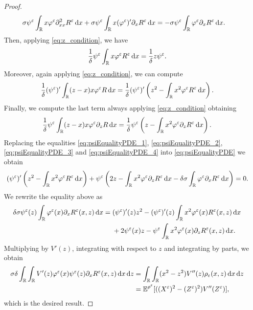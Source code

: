 \documentclass[10pt]{article}
\begin{document}
\begin{proof}
\begin{equation}
\begin{aligned}
	\sigma \psi^\varepsilon \int_{\mathbb{R}}  x \varphi^\varepsilon \partial^2_{xx} R^\varepsilon \,\mathrm{d} x+ \sigma \psi^\varepsilon \int_{\mathbb{R}} x (\varphi^\varepsilon)' \partial_x R^\varepsilon \,\mathrm{d} x &= -\sigma \psi^\varepsilon \int_{\mathbb{R}} \varphi^\varepsilon \partial_x R^\varepsilon \,\mathrm{d} x.
\end{aligned}
\end{equation}
Then, applying \eqref{eq:z_condition}, we have
\begin{equation}\label{eq:psiEqualityPDE_2}
	\frac1\delta \psi^\varepsilon \int_{\mathbb{R}} x \varphi^\varepsilon  R^\varepsilon \,\mathrm{d} x = \frac1\delta z \psi^\varepsilon.
\end{equation}
Moreover, again applying \eqref{eq:z_condition}, we can compute
\begin{equation}\label{eq:psiEqualityPDE_3}
\begin{aligned}
	\frac1\delta (\psi^\varepsilon)' \int_{\mathbb{R}} (z-x)x \varphi^\varepsilon  R \,\mathrm{d} x = \frac1\delta (\psi^\varepsilon)' \left(z^2 - \int_{\mathbb{R}} x^2 \varphi^\varepsilon R^\varepsilon \,\mathrm{d} x\right).
\end{aligned}
\end{equation}
Finally, we compute the last term always applying \eqref{eq:z_condition} obtaining
\begin{equation}\label{eq:psiEqualityPDE_4}
	\frac1\delta \psi^\varepsilon \int_{\mathbb{R}} (z-x)x \varphi^\varepsilon \partial_z R \,\mathrm{d} x = \frac1\delta \psi^\varepsilon\left(z - \int_{\mathbb{R}} x^2 \varphi^\varepsilon \partial_z R^\varepsilon \,\mathrm{d} x\right).
\end{equation}
Replacing the equalities \eqref{eq:psiEqualityPDE_1}, \eqref{eq:psiEqualityPDE_2}, \eqref{eq:psiEqualityPDE_3} and \eqref{eq:psiEqualityPDE_4} into \eqref{eq:psiEqualityPDE} we obtain
\begin{equation}
(\psi^\varepsilon)' \left ( z^2 - \int_{\mathbb{R}} x^2 \varphi^\varepsilon R^\varepsilon \,\mathrm{d} x \right ) + \psi^\varepsilon \left ( 2z - \int_{\mathbb{R}} x^2 \varphi^\varepsilon \partial_z R^\varepsilon \,\mathrm{d} x - \delta \sigma \int_{\mathbb{R}} \varphi^\varepsilon \partial_x R^\varepsilon \,\mathrm{d} x \right ) = 0.
\end{equation}
We rewrite the equality above as
\begin{equation} \label{eq:psiEquality}
\delta \sigma \psi^\varepsilon(z) \int_{\mathbb{R}} \varphi^\varepsilon(x) \partial_x R^\varepsilon(x, z) \,\mathrm{d} x = 
\begin{aligned}[t] &(\psi^\varepsilon)'(z) z^2 - (\psi^\varepsilon)'(z) \int_{\mathbb{R}} x^2 \varphi^\varepsilon(x) R^\varepsilon(x, z) \,\mathrm{d} x \\
& + 2 \psi^\varepsilon(x) z - \psi^\varepsilon \int_{\mathbb{R}} x^2 \varphi^\varepsilon(x) \partial_z R^\varepsilon(x, z) \,\mathrm{d} x.
\end{aligned}
\end{equation}
Multiplying by $V'(z)$, integrating with respect to $z$ and integrating by parts, we obtain
\begin{equation}
\begin{aligned}
\sigma \delta \int_{\mathbb{R}} \int_{\mathbb{R}} V'(z) \varphi^\varepsilon(x) \psi^\varepsilon(z) \partial_x R^\varepsilon(x,z) \,\mathrm{d} x \,\mathrm{d} z &=  \int_{\mathbb{R}} \int_{\mathbb{R}} (x^2 - z^2) V''(z) \rho_\varepsilon(x,z) \,\mathrm{d} x \,\mathrm{d} z \\
&= \operatorname{\mathbb{E}}^{\rho^\varepsilon}[((X^\varepsilon)^2 - (Z^\varepsilon)^2)V''(Z^\varepsilon)],
\end{aligned}
\end{equation}
which is the desired result.
\end{proof}
\end{document}
